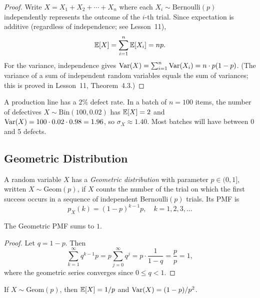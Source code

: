 \documentclass[11pt,a4paper]{article}
\begin{document}
\begin{proof}
Write $X = X_1 + X_2 + \cdots + X_n$ where each
$X_i \sim \mathrm{Bernoulli}(p)$ independently represents the outcome of
the $i$-th trial. Since expectation is additive (regardless of
independence; see Lesson~11),
\[
    \mathbb{E}[X] = \sum_{i=1}^n \mathbb{E}[X_i] = np.
\]
For the variance, independence gives
$\operatorname{Var}(X) = \sum_{i=1}^n \operatorname{Var}(X_i) = n \cdot p(1-p)$.
(The variance of a sum of independent random variables equals the sum of
variances; this is proved in Lesson~11, Theorem~4.3.)
\end{proof}

\begin{example}
\label{ex:binomial_quality}
A production line has a $2\%$ defect rate. In a batch of $n = 100$ items,
the number of defectives $X \sim \mathrm{Bin}(100, 0.02)$ has
$\mathbb{E}[X] = 2$ and $\operatorname{Var}(X) = 100 \cdot 0.02 \cdot 0.98 = 1.96$, so
$\sigma_X \approx 1.40$. Most batches will have between 0 and 5 defects.
\end{example}

\subsection{Geometric Distribution}

\begin{definition}
\label{def:geometric}
A random variable $X$ has a \emph{Geometric distribution} with parameter
$p \in (0, 1]$, written $X \sim \mathrm{Geom}(p)$, if $X$ counts the
number of the trial on which the first success occurs in a sequence of
independent Bernoulli$(p)$ trials. Its PMF is
\[
    p_X(k) = (1-p)^{k-1} p, \quad k = 1, 2, 3, \ldots
\]
\end{definition}

\begin{proposition}
\label{prop:geometric_valid}
The Geometric PMF sums to $1$.
\end{proposition}

\begin{proof}
Let $q = 1 - p$. Then
\[
    \sum_{k=1}^\infty q^{k-1} p
    = p \sum_{j=0}^\infty q^j
    = p \cdot \frac{1}{1 - q}
    = \frac{p}{p} = 1,
\]
where the geometric series converges since $0 \leq q < 1$.
\end{proof}

\begin{proposition}
\label{prop:geometric_moments}
If $X \sim \mathrm{Geom}(p)$, then $\mathbb{E}[X] = 1/p$ and
$\operatorname{Var}(X) = (1 - p)/p^2$.
\end{proposition}
\end{document}
